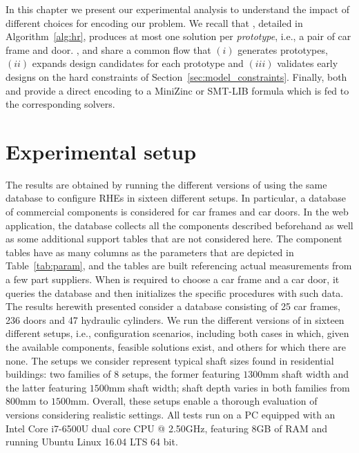 In this chapter we present our experimental analysis to understand 
the impact of different choices for encoding our problem. We recall
that \liftcreatehr{}, detailed in Algorithm~\ref{alg:hr}, produces 
at most one solution per \textit{prototype}, i.e., a pair of
car frame and door.
\liftcreatebf{}, \liftcreaters{} and \liftcreatega{} share a common
flow that $(i)$ generates prototypes, $(ii)$ expands design candidates for
each prototype and $(iii)$ validates early designs on the hard constraints
of Section~\ref{sec:model_constraints}. Finally, both \liftcreatecp{}
and \liftcreatesmt{} provide a direct encoding to a MiniZinc or SMT-LIB 
formula which is fed to the corresponding solvers.

\section{Experimental setup}
%
The results are obtained by running the different versions of \liftcreate{}
using the same database to configure RHEs in sixteen different setups. 
In particular, a database of commercial components is considered for
car frames and car doors. In the \liftcreate{} web application, the
database collects all the components described beforehand as well as
some additional support tables that are not considered here. The
component tables have as many columns as the  parameters that are
depicted in Table~\ref{tab:param}, and the tables are built
referencing actual measurements from a few part suppliers. When
\liftcreate{} is required to choose a car frame and a car door, it
queries the database and then initializes the specific procedures with
such data. The results herewith presented consider a database
consisting of 25 car frames, 236 doors and 47 hydraulic cylinders. 
We run the different versions of \liftcreate{} in sixteen different
setups, i.e., configuration scenarios, including both cases in which,
given the available components, feasible  solutions exist, and others
for which there are none. The setups we  consider represent typical
shaft sizes found in residential buildings:  two families of $8$
setups, the former featuring $1300$mm shaft width and  the latter
featuring $1500$mm shaft width; shaft depth varies in both  families
from $800$mm to $1500$mm. Overall, these setups enable a thorough 
evaluation of \liftcreate{} versions considering realistic settings.
All tests run on a PC equipped with an Intel\textregistered  
\hspace{1pt} Core\texttrademark \hspace{1pt} i7-6500U dual core 
CPU @ 2.50GHz, featuring 8GB of RAM and running Ubuntu Linux 
16.04 LTS 64 bit.

